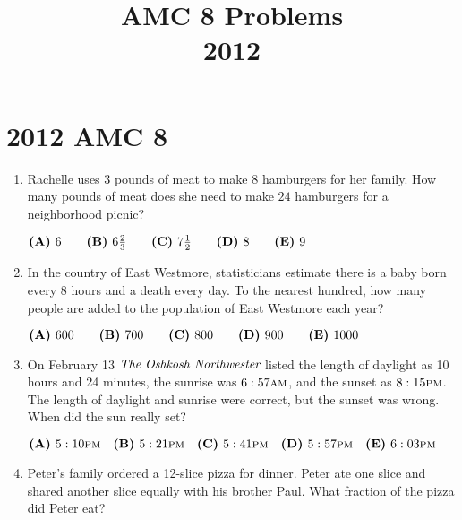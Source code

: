 \documentclass{article}
\title{AMC 8 Problems \\ 2012}
\date{}
\begin{document}
\maketitle\thispagestyle{fancy}\newpage\section*{2012 AMC 8}
\begin{enumerate}[label=\arabic*., itemsep=0.5em]
\item Rachelle uses \( 3 \) pounds of meat to make \( 8 \) hamburgers for her family. How many pounds of meat does she need to make \( 24 \) hamburgers for a neighborhood picnic?

\( \textbf{(A)}\hspace{.05in}6\qquad\textbf{(B)}\hspace{.05in}6\frac{2}3\qquad\textbf{(C)}\hspace{.05in}7\frac{1}2\qquad\textbf{(D)}\hspace{.05in}8\qquad\textbf{(E)}\hspace{.05in}9 \)\par \vspace{0.5em}\item In the country of East Westmore, statisticians estimate there is a baby born every \( 8 \) hours and a death every day. To the nearest hundred, how many people are added to the population of East Westmore each year?

\( \textbf{(A)}\hspace{.05in}600\qquad\textbf{(B)}\hspace{.05in}700\qquad\textbf{(C)}\hspace{.05in}800\qquad\textbf{(D)}\hspace{.05in}900\qquad\textbf{(E)}\hspace{.05in}1000 \)\par \vspace{0.5em}\item On February 13 \(\emph{The Oshkosh Northwester}\) listed the length of daylight as 10 hours and 24 minutes, the sunrise was \( 6:57\textsc{am} \), and the sunset as \( 8:15\textsc{pm} \). The length of daylight and sunrise were correct, but the sunset was wrong. When did the sun really set?

\( \textbf{(A)}\hspace{.05in}5:10\textsc{pm}\quad\textbf{(B)}\hspace{.05in}5:21\textsc{pm}\quad\textbf{(C)}\hspace{.05in}5:41\textsc{pm}\quad\textbf{(D)}\hspace{.05in}5:57\textsc{pm}\quad\textbf{(E)}\hspace{.05in}6:03\textsc{pm} \)\par \vspace{0.5em}\item Peter's family ordered a 12-slice pizza for dinner. Peter ate one slice and shared another slice equally with his brother Paul. What fraction of the pizza did Peter eat?


\end{enumerate}
\end{document}
